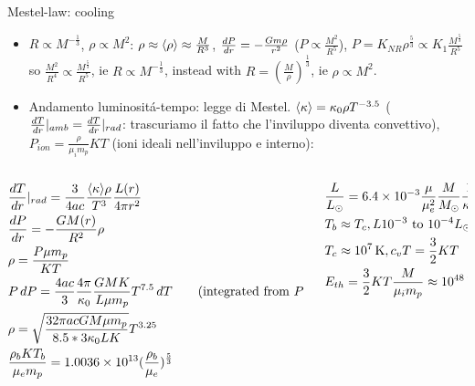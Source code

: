 \begin{frame}{Mestel-law: cooling}
    \begin{itemize}
        \item $R\propto M^{-\frac{1}{3}}$, $\rho\propto M^2$: $\rho\approx\exv{\rho}\approx \frac{M}{R^3}$, $\TDy{r}{P}=-\frac{Gm\rho}{r^2}$ ($P\propto \frac{M^2}{R^5}$), $P=K_{NR}\rho^{\frac{5}{3}}\propto K_1 \frac{M^{\frac{5}{3}}}{R^5}$ so $\frac{M^2}{R^4}\propto \frac{M^{\frac{5}{3}}}{R^5}$, ie $R\propto M^{-\frac{1}{3}}$, instead with $R=(\frac{M}{\rho})^{\frac{1}{3}}$, ie $\rho\propto M^2$.
        \item Andamento luminosit\'a-tempo: legge di Mestel. $\exv{\kappa}=\kappa_0\rho T^{-3.5}$ ($\TDy{r}{T}|_{amb}=\TDy{r}{T}|_{rad}$: trascuriamo il fatto che l'inviluppo diventa convettivo), $P_{ion}=\frac{\rho}{\mu_im_p}KT$ (ioni ideali nell'inviluppo e interno):
    \end{itemize}
    \begin{columns}[T]
        \begin{column}{0.55\textwidth}
            \begin{align*}
                &\TDy{r}{T}|_{rad}=\frac{3}{4ac}\frac{\exv{\kappa}\rho}{T^3}\frac{L(r)}{4\pi r^2}\\
                &\TDy{r}{P}=-\frac{GM(r)}{R^2}\rho\\
                &\rho=\frac{P\mu m_p}{KT}\\
                &P\,dP=\frac{4ac}{3}\frac{4\pi}{\kappa_0}\frac{GMK}{L\mu m_p}T^{7.5}\,dT\tag{integrated from $P=0$, $T=0$}\\
                &\rho=\sqrt{\frac{32\pi acGM\mu m_p}{8.5*3\kappa_0LK}}T^{3.25}\\
                &\frac{\rho_bKT_b}{\mu_e m_p}=\num{1.0036e13}(\frac{\rho_b}{\mu_e})^{\frac{5}{3}}\\
            \end{align*}
        \end{column}
        \begin{column}{0.45\textwidth}
            \begin{align*}
                &\frac{L}{\lsun{}}=\num{6.4e-3}\frac{\mu}{\mu_e^2}\frac{M}{\msun{}}\frac{1}{\kappa_0}T_b^{3.5}\\
                &T_b\approx T_c,L\numrange{e-3}{e-4}\lsun{}\\
                &T_c\approx\SI{e7}{\kelvin}, c_vT=\frac{3}{2}KT\\
                &E_{th}=\frac{3}{2} KT \frac{M}{\mu_im_p}\approx\SI{e48}{\erg}\\

\end{align*}
\end{column}
\end{columns}
\end{frame}
